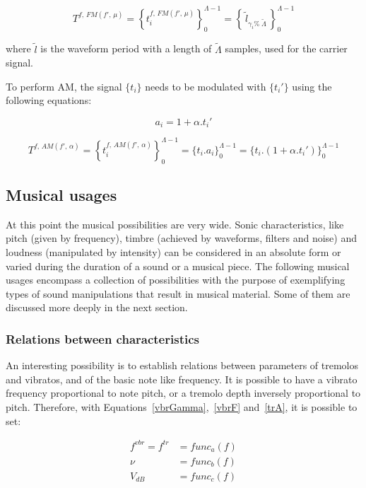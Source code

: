 \begin{equation}\label{fmT}
T^{f,\, FM(f',\,\mu)}=\left\{ t_i^{f,\,FM(f',\,\mu)} \right\}_0^{\Lambda-1}=\left\{\,\widetilde{l}_{\gamma_i \%\; \widetilde{\Lambda} } \,\right\}_0^{\Lambda-1}
\end{equation}


\noindent where $\widetilde{l}$ is the waveform period with a length of $\widetilde{\Lambda}$ samples, used for the carrier signal.

To perform AM, the signal $\{t_i\}$ needs to be modulated with $\{t_i'\}$ using the following equations:

\begin{equation}\label{amA}
a_i=1 + \alpha . t_i'
\end{equation}

\begin{equation}\label{amT}
T^{f,\,AM(f',\,\alpha)}=\left\{ t_i^{f,\,AM(f',\,\alpha)} \right\}_0^{\Lambda-1}=\{ t_i . a_i \}_0^{\Lambda-1}= \{t_i . (1 + \alpha . t_i')    \}_0^{\Lambda-1}
\end{equation}

\subsection{Musical usages}\label{subsec:mus2}
At this point the musical possibilities are very wide.
Sonic characteristics, like pitch (given by frequency),
timbre (achieved by waveforms, filters and noise) and loudness (manipulated by intensity)
can be considered in an absolute form or varied during the duration of a sound
or a musical piece.
The following musical usages encompass a collection of possibilities with the purpose of exemplifying types of sound manipulations that result in musical material.
Some of them are discussed more deeply in the next section.

\subsubsection{Relations between characteristics}
An interesting possibility is to establish relations between parameters of
tremolos and vibratos, and of the basic note like frequency. It is possible to have a vibrato frequency proportional
to note pitch, or a tremolo depth inversely proportional to
pitch. Therefore, with Equations~\ref{vbrGamma},~\ref{vbrF} and~\ref{trA}, it is possible to set:

\begin{equation}\label{eq:vinculos}
\begin{split}
f^{vbr} = f^{tr} & = func_a(f) \\
\nu & = func_b(f) \\
V_{dB} & = func_c(f)
\end{split}
\end{equation}

